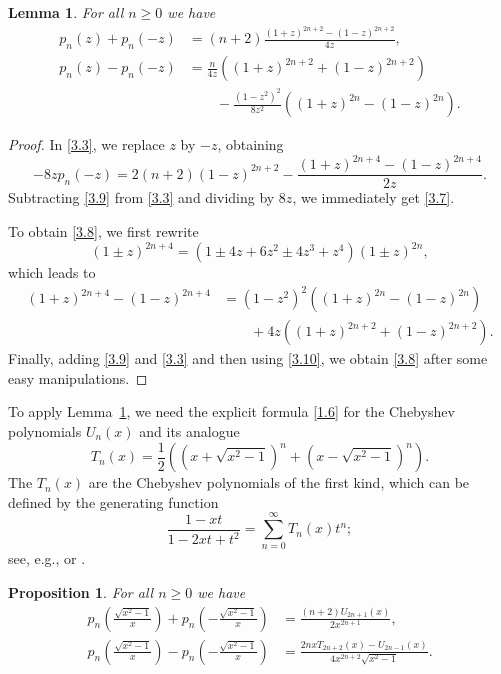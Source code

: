 \documentclass{amsart}
\theoremstyle{plain}
\newtheorem{proposition}[theorem]{Proposition}
\newtheorem{lemma}[theorem]{Lemma}
\numberwithin{equation}{section}
\begin{document}
\begin{lemma}\label{lem:3.3}
For all $n\geq 0$ we have
\begin{align}
p_n(z)+p_n(-z)&=(n+2)\frac{(1+z)^{2n+2}-(1-z)^{2n+2}}{4z},\label{3.7}\\
p_n(z)-p_n(-z)&=\frac{n}{4z}\left((1+z)^{2n+2}+(1-z)^{2n+2}\right)\label{3.8}\\
&\qquad -\frac{(1-z^2)^2}{8z^2}\left((1+z)^{2n}-(1-z)^{2n}\right). \nonumber
\end{align}
\end{lemma}

\begin{proof}
In \eqref{3.3}, we replace $z$ by $-z$, obtaining
\begin{equation}\label{3.9}
-8zp_n(-z)=2(n+2)(1-z)^{2n+2}-\frac{(1+z)^{2n+4}-(1-z)^{2n+4}}{2z}.
\end{equation}
Subtracting \eqref{3.9} from \eqref{3.3} and dividing by $8z$, we immediately
get \eqref{3.7}.

To obtain \eqref{3.8}, we first rewrite
\[
(1\pm z)^{2n+4}=\left(1\pm 4z+6z^2\pm 4z^3+z^4\right)(1\pm z)^{2n},
\]
which leads to 
\begin{align}
(1+z)^{2n+4}-(1-z)^{2n+4}
&=\left(1-z^2\right)^2\left((1+z)^{2n}-(1-z)^{2n}\right)\label{3.10}\\
&\qquad +4z\left((1+z)^{2n+2}+(1-z)^{2n+2}\right). \nonumber
\end{align}
Finally, adding \eqref{3.9} and \eqref{3.3} and then using \eqref{3.10}, we
obtain \eqref{3.8} after some easy manipulations.
\end{proof}

To apply Lemma~\ref{lem:3.3}, we need the explicit formula \eqref{1.6} for the
Chebyshev polynomials $U_n(x)$ and its analogue
\begin{equation}\label{3.11}
T_n(x)=\frac{1}{2}\left(\left(x+\sqrt{x^2-1}\right)^n
+\left(x-\sqrt{x^2-1}\right)^n\right).
\end{equation}
The $T_n(x)$ are the Chebyshev polynomials of the first kind, which can be 
defined by the generating function
\begin{equation}\label{3.12}
\frac{1-xt}{1-2xt+t^2} = \sum_{n=0}^\infty T_n(x)t^n;
\end{equation}
see, e.g., \cite[p.~41]{Ri} or \cite[(18.12.8)]{DLMF}.

\begin{proposition}\label{prop:3.4}
For all $n\geq 0$ we have
\begin{align}
p_n(\tfrac{\sqrt{x^2-1}}{x})+p_n(-\tfrac{\sqrt{x^2-1}}{x})
&=\frac{(n+2)U_{2n+1}(x)}{2x^{2n+1}},\label{3.13}\\
p_n(\tfrac{\sqrt{x^2-1}}{x})-p_n(-\tfrac{\sqrt{x^2-1}}{x})
&=\frac{2nxT_{2n+2}(x)-U_{2n-1}(x)}{4x^{2n+2}\sqrt{x^2-1}}. \label{3.14}
\end{align}
\end{proposition}
\end{document}

